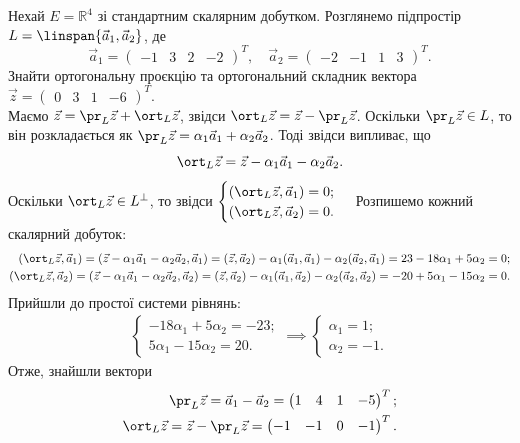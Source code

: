 \documentclass{math_library}
\begin{document}
\begin{example}
\label{how_to_find_proj_and_ort}
Нехай $E = \mathbb{R}^4$ зі стандартним скалярним добутком. Розглянемо підпростір $L = \linspan\{ \vec{a}_1, \vec{a}_2 \}$, де
\[
\vec{a}_1 = \begin{pmatrix}
-1 & 3 & 2 & -2
\end{pmatrix}^T, \quad \vec{a}_2 = \begin{pmatrix}
-2 & -1 & 1 & 3
\end{pmatrix}^T.
\]
Знайти ортогональну проєкцію та ортогональний складник вектора $\vec{z} = \begin{pmatrix}
0 & 3 & 1 & -6
\end{pmatrix}^T$.
\bigskip \\
Маємо $\vec{z} = \pr_L \vec{z} + \ort_L \vec{z}$, звідси $\ort_L \vec{z} = \vec{z} - \pr_L \vec{z}$. Оскільки $\pr_L \vec{z} \in L$, то він розкладається як $\pr_L \vec{z} = \alpha_1 \vec{a}_1 + \alpha_2 \vec{a}_2$. Тоді звідси випливає, що
\[
\ort_L \vec{z} = \vec{z} - \alpha_1 \vec{a}_1 - \alpha_2 \vec{a}_2.
\]
Оскільки $\ort_L \vec{z} \in L^\perp$, то звідси $\begin{cases} (\ort_L \vec{z}, \vec{a}_1) = 0; \\ (\ort_L \vec{z}, \vec{a}_2) = 0. \end{cases}$ Розпишемо кожний скалярний добуток:
\begin{align*}
(\ort_L \vec{z}, \vec{a}_1) = (\vec{z} - \alpha_1 \vec{a}_1 - \alpha_2 \vec{a}_2, \vec{a}_1) = (\vec{z}, \vec{a}_2) - \alpha_1 (\vec{a}_1,\vec{a}_1) - \alpha_2 (\vec{a}_2, \vec{a}_1) = 23 - 18 \alpha_1 +5\alpha_2 = 0; \\
(\ort_L \vec{z}, \vec{a}_2) = (\vec{z} - \alpha_1 \vec{a}_1 - \alpha_2 \vec{a}_2, \vec{a}_2) = (\vec{z}, \vec{a}_2) - \alpha_1 (\vec{a}_1,\vec{a}_2) - \alpha_2 (\vec{a}_2, \vec{a}_2) = -20 +5 \alpha_1 - 15 \alpha_2 = 0.
\end{align*}
Прийшли до простої системи рівнянь:
\begin{align*}
\begin{cases} -18\alpha_1 + 5\alpha_2 = -23; \\ 5\alpha_1-15\alpha_2 = 20.  \end{cases} \implies \begin{cases} \alpha_1 = 1; \\ \alpha_2 = -1. \end{cases}
\end{align*}
Отже, знайшли вектори
\begin{align*}
\pr_L \vec{z} = \vec{a}_1 - \vec{a}_2 = \begin{pmatrix}
1 & 4 & 1 & -5
\end{pmatrix}^T;\\
\ort_L \vec{z} = \vec{z} - \pr_L \vec{z} = \begin{pmatrix}
-1 & -1 & 0 & -1
\end{pmatrix}^T.
\end{align*}
\end{example}
\end{document}
